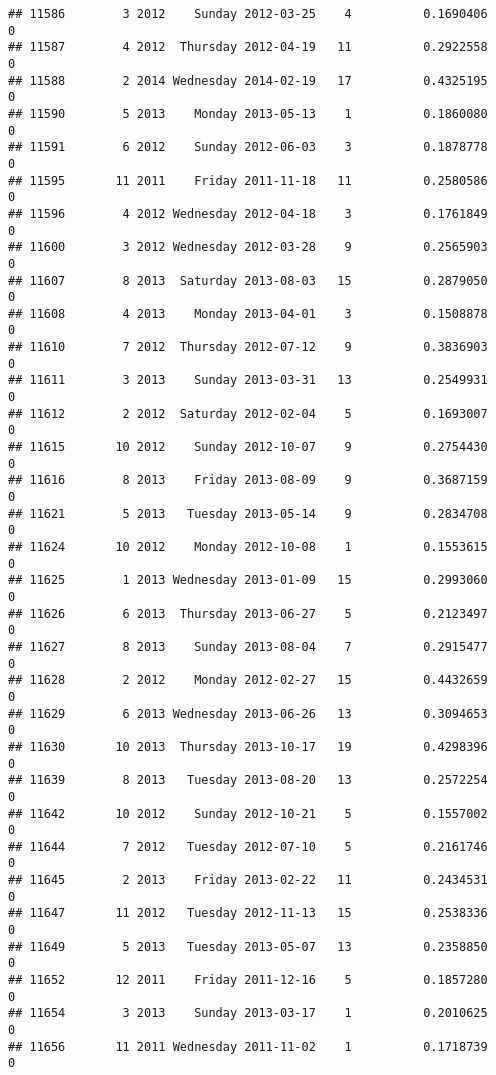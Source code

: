 \documentclass[
]{article}
\begin{document}
\begin{verbatim}
## 11586        3 2012    Sunday 2012-03-25    4          0.1690406             0
## 11587        4 2012  Thursday 2012-04-19   11          0.2922558             0
## 11588        2 2014 Wednesday 2014-02-19   17          0.4325195             0
## 11590        5 2013    Monday 2013-05-13    1          0.1860080             0
## 11591        6 2012    Sunday 2012-06-03    3          0.1878778             0
## 11595       11 2011    Friday 2011-11-18   11          0.2580586             0
## 11596        4 2012 Wednesday 2012-04-18    3          0.1761849             0
## 11600        3 2012 Wednesday 2012-03-28    9          0.2565903             0
## 11607        8 2013  Saturday 2013-08-03   15          0.2879050             0
## 11608        4 2013    Monday 2013-04-01    3          0.1508878             0
## 11610        7 2012  Thursday 2012-07-12    9          0.3836903             0
## 11611        3 2013    Sunday 2013-03-31   13          0.2549931             0
## 11612        2 2012  Saturday 2012-02-04    5          0.1693007             0
## 11615       10 2012    Sunday 2012-10-07    9          0.2754430             0
## 11616        8 2013    Friday 2013-08-09    9          0.3687159             0
## 11621        5 2013   Tuesday 2013-05-14    9          0.2834708             0
## 11624       10 2012    Monday 2012-10-08    1          0.1553615             0
## 11625        1 2013 Wednesday 2013-01-09   15          0.2993060             0
## 11626        6 2013  Thursday 2013-06-27    5          0.2123497             0
## 11627        8 2013    Sunday 2013-08-04    7          0.2915477             0
## 11628        2 2012    Monday 2012-02-27   15          0.4432659             0
## 11629        6 2013 Wednesday 2013-06-26   13          0.3094653             0
## 11630       10 2013  Thursday 2013-10-17   19          0.4298396             0
## 11639        8 2013   Tuesday 2013-08-20   13          0.2572254             0
## 11642       10 2012    Sunday 2012-10-21    5          0.1557002             0
## 11644        7 2012   Tuesday 2012-07-10    5          0.2161746             0
## 11645        2 2013    Friday 2013-02-22   11          0.2434531             0
## 11647       11 2012   Tuesday 2012-11-13   15          0.2538336             0
## 11649        5 2013   Tuesday 2013-05-07   13          0.2358850             0
## 11652       12 2011    Friday 2011-12-16    5          0.1857280             0
## 11654        3 2013    Sunday 2013-03-17    1          0.2010625             0
## 11656       11 2011 Wednesday 2011-11-02    1          0.1718739             0

\end{verbatim}
\end{document}
